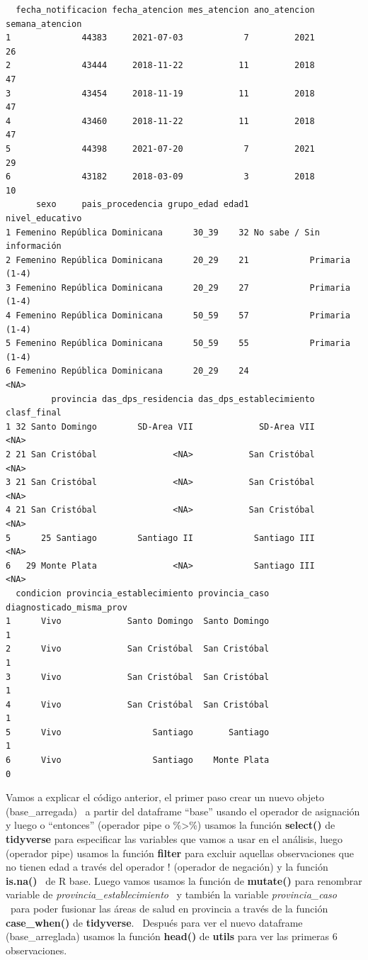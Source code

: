 \documentclass[
  letterpaper,
  DIV=11,
  numbers=noendperiod]{scrreprt}
\begin{document}
\begin{verbatim}
  fecha_notificacion fecha_atencion mes_atencion ano_atencion semana_atencion
1              44383     2021-07-03            7         2021              26
2              43444     2018-11-22           11         2018              47
3              43454     2018-11-19           11         2018              47
4              43460     2018-11-22           11         2018              47
5              44398     2021-07-20            7         2021              29
6              43182     2018-03-09            3         2018              10
      sexo     pais_procedencia grupo_edad edad1           nivel_educativo
1 Femenino República Dominicana      30_39    32 No sabe / Sin información
2 Femenino República Dominicana      20_29    21            Primaria (1-4)
3 Femenino República Dominicana      20_29    27            Primaria (1-4)
4 Femenino República Dominicana      50_59    57            Primaria (1-4)
5 Femenino República Dominicana      50_59    55            Primaria (1-4)
6 Femenino República Dominicana      20_29    24                      <NA>
         provincia das_dps_residencia das_dps_establecimiento clasf_final
1 32 Santo Domingo        SD-Area VII             SD-Area VII        <NA>
2 21 San Cristóbal               <NA>           San Cristóbal        <NA>
3 21 San Cristóbal               <NA>           San Cristóbal        <NA>
4 21 San Cristóbal               <NA>           San Cristóbal        <NA>
5      25 Santiago        Santiago II            Santiago III        <NA>
6   29 Monte Plata               <NA>            Santiago III        <NA>
  condicion provincia_establecimiento provincia_caso diagnosticado_misma_prov
1      Vivo             Santo Domingo  Santo Domingo                        1
2      Vivo             San Cristóbal  San Cristóbal                        1
3      Vivo             San Cristóbal  San Cristóbal                        1
4      Vivo             San Cristóbal  San Cristóbal                        1
5      Vivo                  Santiago       Santiago                        1
6      Vivo                  Santiago    Monte Plata                        0
\end{verbatim}

Vamos a explicar el código anterior, el primer paso crear un nuevo
objeto (base\_arregada) ~a partir del dataframe ``base'' usando el
operador de asignación y luego o ``entonces'' (operador pipe o
\%\textgreater\%) usamos la función \textbf{select()} de
\textbf{tidyverse} para especificar las variables que vamos a usar en el
análisis, luego (operador pipe) usamos la función \textbf{filter} para
excluir aquellas observaciones que no tienen edad a través del operador
! (operador de negación) y la función \textbf{is.na()} ~de R base. Luego
vamos usamos la función de \textbf{mutate()} para renombrar variable de
\emph{provincia\_establecimiento} ~y también la variable
\emph{provincia\_caso} ~para poder fusionar las áreas de salud en
provincia a través de la función \textbf{case\_when()} de
\textbf{tidyverse}. ~Después para ver el nuevo dataframe
(base\_arreglada) usamos la función \textbf{head()} de \textbf{utils}
para ver las primeras 6 observaciones.
\end{document}
